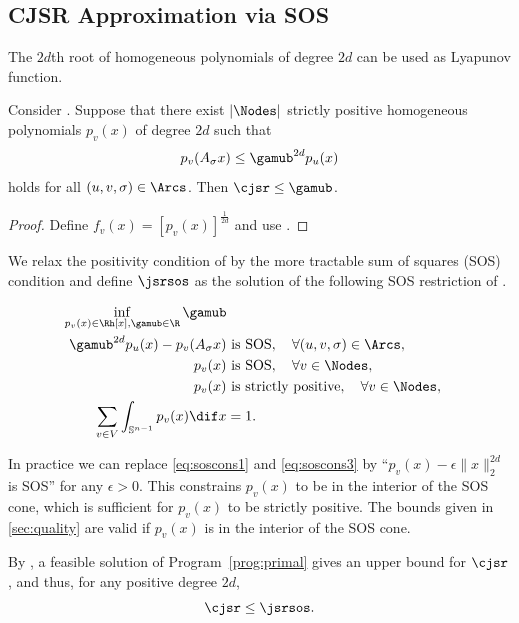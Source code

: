 \subsection{CJSR Approximation via SOS}
\label{sec:sos}

The $2d$th root of homogeneous polynomials of degree $2d$ can be used as Lyapunov function.
\begin{proposition}
  \label{prop:pos}
  Consider .
  Suppose that there exist $|\Nodes|$ strictly positive homogeneous polynomials $p_v(x)$ of degree $2d$
  such that
  \[ p_{v}(A_\sigma x) \leq \gamub^{2d}p_{u}(x) \]
  holds for all \arc{} $(u,v,\sigma) \in \Arcs$.
  Then $\cjsr \leq \gamub$.
  \begin{proof}
    Define $f_v(x) = [p_v(x)]^{\frac{1}{2d}}$ and use .
  \end{proof}
\end{proposition}

We relax the positivity condition of  by the more tractable sum of squares (SOS) condition and
define $\jsrsos$ as the solution of the following SOS restriction of .
\begin{myprog}[Primal]
  \label{prog:primal}
  \begin{align}
    \notag
    \inf_{p_v(x) \in \Rh[x],\gamub \in \R} \gamub\\
    \notag
    \gamub^{2d} p_u(x) - p_v(A_\sigma x) & \text{ is SOS}, \quad \forall (u, v, \sigma) \in \Arcs,\\
    \label{eq:soscons1}
    p_v(x) & \text{ is SOS}, \quad \forall v \in \Nodes,\\
    \label{eq:soscons3}
    p_v(x) & \text{ is strictly positive}, \quad \forall v \in \Nodes,\\
    \notag
    \sum_{v \in V} \int_{\mathbb{S}^{n-1}} p_v(x) \dif x & = 1.
  \end{align}
\end{myprog}

\begin{myrem}
  In practice we can replace \eqref{eq:soscons1} and \eqref{eq:soscons3} by ``$p_v(x) - \epsilon\|x\|_2^{2d}$ is SOS''
  for any $\epsilon > 0$.
  This constrains $p_v(x)$ to be in the interior of the SOS cone,
  which is sufficient for $p_v(x)$ to be strictly positive.
  The bounds given in \Sect\ref{sec:quality} are valid
  if $p_v(x)$ is in the interior of the SOS cone.
\end{myrem}

By ,
a feasible solution of Program~\ref{prog:primal} gives an upper bound for $\cjsr$,
and thus, for any positive degree $2d$,
\begin{equation}
  \label{eq:upperbound}
  \cjsr \leq \jsrsos.
\end{equation}


